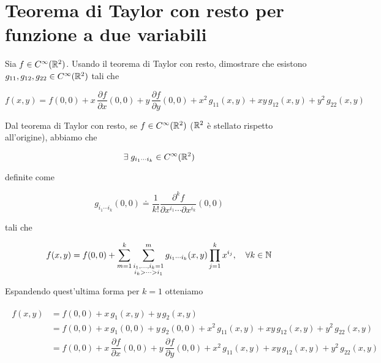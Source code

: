 %

\newpage

%

\section{Teorema di Taylor con resto per funzione a due variabili}\label{es1-5}

\begin{tcolorbox}
	Sia $ f \in C^{\infty}(\mathbb{R}^{2}) $. Usando il teorema di Taylor con resto, dimostrare che esistono $ g_{11},g_{12},g_{22} \in C^{\infty}(\mathbb{R}^{2}) $ tali che
	
	\begin{equation}
		f(x,y) = f(0,0) + x \, \dfrac{\partial f}{\partial x} (0,0) + y \, \dfrac{\partial f}{\partial y} (0,0) + x^{2} \, g_{11}(x,y) + x y \, g_{12}(x,y) + y^{2} \, g_{22}(x,y)
	\end{equation}
\end{tcolorbox}

Dal teorema di Taylor con resto, se $ f \in C^{\infty} (\mathbb{R}^{2}) $ ($ \mathbb{R}^{2} $ è stellato rispetto all'origine), abbiamo che

\begin{equation}
	\exists \; g_{i_{1} \cdots i_{k}} \in C^{\infty} (\mathbb{R}^{2})
\end{equation}

definite come

\begin{equation}
	g_{i_{1} \cdots i_{k}} (0,0) \doteq \dfrac{1}{k!} \dfrac{\partial^{k} f}{\partial x^{i_{1}} \cdots \partial x^{i_{k}}} (0,0)
\end{equation}

tali che

\begin{equation}
	f(x,y) = f(0,0) + \sum_{m=1}^{k} \sum_{\substack{i_{1},\dots,i_{k}=1 \\ {i_{k}} > \cdots > i_{1}}}^{m} g_{i_{1} \cdots i_{k}} (x,y) \prod_{j=1}^{k} x^{i_{j}} \qcomma \forall k \in \N
\end{equation}

Espandendo quest'ultima forma per $ k=1 $ otteniamo

\begin{align}
	\begin{split}
		f(x,y) &= f(0,0) + x \, g_{1} (x,y) + y \, g_{2} (x,y)\\
		&= f(0,0) + x \, g_{1} (0,0) + y \, g_{2} (0,0) + x^{2} \, g_{11}(x,y) + x y \, g_{12}(x,y) + y^{2} \, g_{22}(x,y)\\
		&= f(0,0) + x \, \dfrac{\partial f}{\partial x} (0,0) + y \, \dfrac{\partial f}{\partial y} (0,0) + x^{2} \, g_{11}(x,y) + x y \, g_{12}(x,y) + y^{2} \, g_{22}(x,y)
	\end{split}
\end{align}

